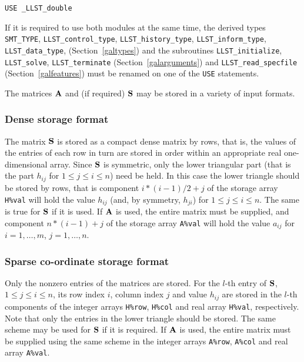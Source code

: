 \documentclass{galahad}
\newcommand{\packagename}{LLST}
\newcommand{\fullpackagename}{\libraryname\_\packagename}
\begin{document}
\medskip{}

\hskip0.5in {\tt USE  \fullpackagename\_double}

\medskip

\noindent
If it is required to use both modules at the same time, the derived types 
{\tt SMT\_TYPE},
{\tt \packagename\_control\_type}, 
{\tt \packagename\_history\_\-type},
{\tt \packagename\_inform\_type}, 
{\tt \packagename\_data\_type},
(Section~\ref{galtypes})
and the subroutines
{\tt \packagename\_initialize},  
{\tt \packagename\_solve}, {\tt \packagename\_\-terminate}
(Section~\ref{galarguments})
and 
{\tt \packagename\_read\_specfile}
(Section~\ref{galfeatures})
must be renamed on one of the {\tt USE} statements.


\galmatrix
The matrices ${\mathbf{A}}$ and (if required) ${\mathbf{S}}$
may be stored in a variety of input formats.

\subsubsection{Dense storage format}\label{dense}
The matrix ${\mathbf{S}}$ is stored as a compact 
dense matrix by rows, that is, the values of the entries of each row in turn are
stored in order within an appropriate real one-dimensional array.
Since ${\mathbf{S}}$ is symmetric, only the lower triangular part (that is the part 
$h_{ij}$ for $1 \leq j \leq i \leq n$) need be held. In this case
the lower triangle should be stored by rows, that is 
component $i \ast (i-1)/2 + j$ of the storage array {\tt H\%val}  
will hold the value $h_{ij}$ (and, by symmetry, $h_{ji}$)
for $1 \leq j \leq i \leq n$. The same is true for ${\mathbf{S}}$ if it is used.
If ${\mathbf{A}}$ is used, the entire matrix must be supplied, and 
component $n \ast (i-1) + j$ of the storage array {\tt A\%val} will hold the 
value $a_{ij}$ for $i = 1, \ldots , m$, $j = 1, \ldots , n$.

\subsubsection{Sparse co-ordinate storage format}\label{coordinate}
Only the nonzero entries of the matrices are stored. 
For the $l$-th entry of ${\mathbf{S}}$, $1 \leq j \leq i \leq n$, 
its row index $i$, column index $j$ and value $h_{ij}$
are stored in the $l$-th components of the integer arrays {\tt H\%row}, 
{\tt H\%col} and real array {\tt H\%val}, respectively.
Note that only the entries in the lower triangle should be stored.
The same scheme may be used for ${\mathbf{S}}$ if it is required. 
If ${\mathbf{A}}$ is used, the entire matrix must be supplied using the same scheme 
in the integer arrays {\tt A\%row}, {\tt A\%col} and real array {\tt A\%val}.
\end{document}
